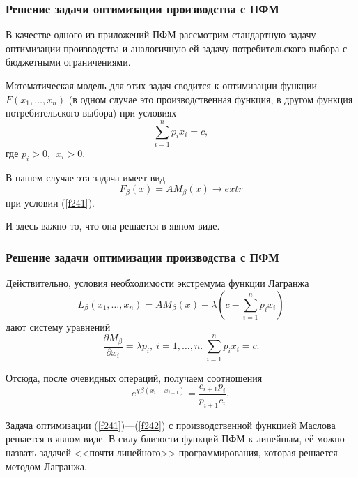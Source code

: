\documentclass[10pt, pdf, hyperref={unicode}]{beamer}
\begin{document}
    \begin{frame}
        \frametitle{Решение задачи оптимизации производства с ПФМ}
        \begin{center}
            \begin{minipage}[h]{0.97\linewidth}
                В качестве одного из приложений ПФМ рассмотрим стандартную задачу оптимизации производства и аналогичную ей задачу потребительского выбора с бюджетными ограничениями.

                Математическая модель для этих задач сводится к оптимизации функции $F(x_1,\ldots,x_n)$ (в одном случае это производственная функция, в другом функция потребительского выбора) при условиях
                \begin{equation}\label{f241}
                \sum\limits^n_{i=1}p_i x_i =c, %
                \end{equation}
                где $p_i>0, \ \ x_i>0$.

                В нашем случае эта задача имеет вид
                \begin{equation}\label{f242}
                F_\beta(x)=A M_\beta(x)\rightarrow extr %
                \end{equation}
                при условии (\ref{f241}).

                И здесь важно то, что она решается в явном виде.
            \end{minipage}
        \end{center}
    \end{frame}

    \begin{frame}
        \frametitle{Решение задачи оптимизации производства с ПФМ}
        \begin{center}
            \begin{minipage}[h]{0.97\linewidth}
                Действительно, условия необходимости экстремума функции Лагранжа
                $$
                L_\beta (x_1,\ldots,x_n)=A M_\beta(x)-\lambda(c-\sum\limits_{i=1}^n p_i x_i)$$
                дают систему уравнений
                \begin{equation}\label{f243}
                \frac{\partial M_\beta}{\partial x_i}=\lambda p_i, \ i=1,\ldots,n. \ \sum\limits^n_{i=1} p_i x_i =c. %
                \end{equation}

                Отсюда, после очевидных операций, получаем соотношения
                \begin{equation}\label{f244}
                e^{\chi \beta (x_i-x_{i+1})}=\frac{c_{i+1}p_i}{p_{i+1}c_i}, %
                \end{equation}

                Задача оптимизации (\ref{f241})---(\ref{f242}) с производственной функцией Маслова решается в явном виде. В силу близости
                функций ПФМ к линейным, её можно назвать задачей <<почти-линейного>>
                программирования, которая решается методом Лагранжа.
            \end{minipage}
        \end{center}
    \end{frame}
\end{document}
